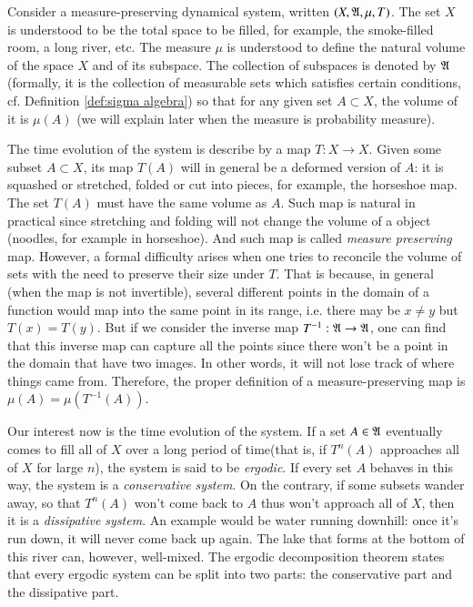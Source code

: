 \documentclass[12pt,a4paper]{article}
\begin{document}
	Consider a measure-preserving dynamical system, written $(X,\mathfrak{A},\mu, T)$. The set $X$ is understood to be the total space to be filled, for example, the smoke-filled room, a long river, etc. The measure $\mu$ is understood to define the natural volume of the space $X$ and of its subspace. The collection of subspaces is denoted by $\mathfrak{A}$ (formally, it is the collection of measurable sets which satisfies certain conditions, cf. Definition \ref{def:sigma algebra}) so that for any given set $A\subset X$, the volume of it is $\mu(A)$ (we will explain later when the measure is probability measure). 
	
	The time evolution of the system is describe by a map $T:X\rightarrow X$. Given some subset $A\subset X$, its map $T(A)$ will in general be a deformed version of $A$: it is squashed or stretched, folded or cut into pieces, for example, the horseshoe map. The set $T(A)$ must have the same volume as $A$. Such map is natural in practical since stretching and folding will not change the volume of a object (noodles, for example in horseshoe). And such map is called \emph{measure preserving} map. However, a formal difficulty arises when one tries to reconcile the volume of sets with the need to preserve their size under $T$. That is because, in general (when the map is not invertible), several different points in the domain of a function would map into the same point in its range, i.e. there may be $x\neq y$ but $T(x)=T(y)$. But if we consider the inverse map $T^{-1}: \mathfrak{A}\to \mathfrak{A}$, one can find that this inverse map can capture all the points since there won't be a point in the domain that have two images. In other words, it will not lose track of where things came from. Therefore, the proper definition of a measure-preserving map is $\mu(A)=\mu(T^{-1}(A))$.
	
	Our interest now is the time evolution of the system. If a set $A\in \mathfrak{A}$ eventually comes to fill all of $X$ over a long period of time(that is, if $T^n(A)$ approaches all of $X$ for large $n$), the system is said to be \emph{ergodic}. If every set $A$ behaves in this way, the system is a \emph{conservative system}. On the contrary, if some subsets wander away, so that $T^n(A)$ won't come back to $A$ thus won't approach all of $X$, then it is a \emph{dissipative system}. An example would be water running downhill: once it's run down, it will never come back up again. The lake that forms at the bottom of this river can, however, well-mixed. The ergodic decomposition theorem states that every ergodic system can be split into two parts: the conservative part and the dissipative part.
	
\end{document}
